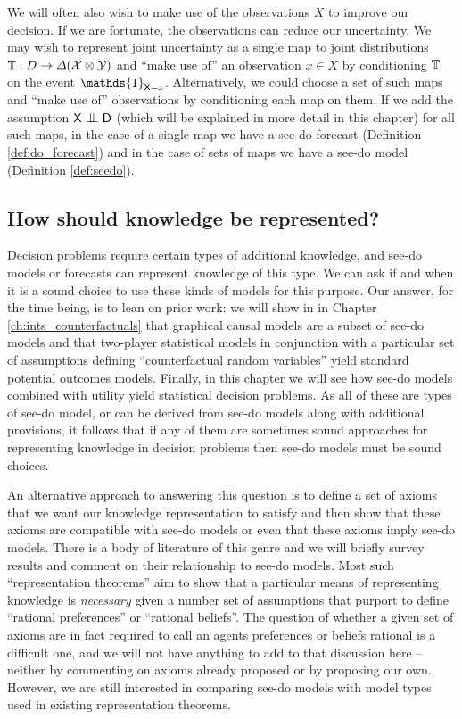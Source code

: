 We will often also wish to make use of the observations $X$ to improve our decision. If we are fortunate, the observations can reduce our uncertainty. We may wish to represent joint uncertainty as a single map to joint distributions $\mathbb{T}:D\to \Delta(\mathcal{X}\otimes \mathcal{Y})$ and ``make use of'' an observation $x\in X$ by conditioning $\mathbb{T}$ on the event $\mathds{1}_{\RV{X}=x}$. Alternatively, we could choose a set of such maps and ``make use of'' observations by conditioning each map on them. If we add the assumption $\RV{X}\CI \RV{D}$ (which will be explained in more detail in this chapter) for all such maps, in the case of a single map we have a see-do forecast (Definition \ref{def:do_forecast}) and in the case of sets of maps we have a see-do model (Definition \ref{def:seedo}).


\subsection{How should knowledge be represented?}

Decision problems require certain types of additional knowledge, and see-do models or forecasts can represent knowledge of this type. We can ask if and when it is a sound choice to use these kinds of models for this purpose. Our answer, for the time being, is to lean on prior work: we will show in in Chapter \ref{ch:ints_counterfactuals} that graphical causal models are a subset of see-do models and that two-player statistical models in conjunction with a particular set of assumptions defining ``counterfactual random variables'' yield standard potential outcomes models. Finally, in this chapter we will see how see-do models combined with utility yield statistical decision problems. As all of these are types of see-do model, or can be derived from see-do models along with additional provisions, it follows that if any of them are sometimes sound approaches for representing knowledge in decision problems then see-do models must be sound choices.

An alternative approach to answering this question is to define a set of axioms that we want our knowledge representation to satisfy and then show that these axioms are compatible with see-do models or even that these axioms imply see-do models. There is a body of literature of this genre and we will briefly survey results and comment on their relationship to see-do models. Most such ``representation theorems'' aim to show that a particular means of representing knowledge is \emph{necessary} given a number set of assumptions that purport to define ``rational preferences'' or ``rational beliefs''. The question of whether a given set of axioms are in fact required to call an agents preferences or beliefs rational is a difficult one, and we will not have anything to add to that discussion here -- neither by commenting on axioms already proposed or by proposing our own. However, we are still interested in comparing see-do models with model types used in existing representation theorems.

